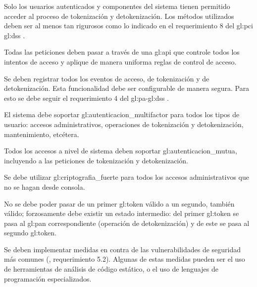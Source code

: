 {
  Solo los usuarios autenticados y componentes del sistema tienen permitido
  acceder al proceso de tokenización y detokenización. Los métodos utilizados
  deben ser al menos tan rigurosos como lo indicado en el requerimiento 8 del
  \gls{gl:pci} \gls{gl:dss} \cite{pci_dss}.

  {
    Todas las peticiones deben pasar a través de una \gls{gl:api} que controle
    todos los intentos de acceso y aplique de manera uniforma reglas de
    control de acceso.
  }

  {
    Se deben registrar todos los eventos de acceso, de tokenización y
    de detokenización. Esta funcionalidad debe ser configurable de manera
    segura. Para esto se debe seguir el requerimiento 4 del
    \gls{gl:pa}-\gls{gl:dss} \cite{dss_pa}.
  }

  {
    El sistema debe soportar \gls{gl:autenticacion_multifactor} para todos
    los tipos de usuario: accesos administrativos, operaciones de tokenización
    y detokenización, mantenimiento, etcétera.
  }

  {
    Todos los accesos a nivel de sistema deben soportar
    \gls{gl:autenticacion_mutua}, incluyendo a las peticiones de tokenización
    y detokenización.
  }

  {
    Se debe utilizar \gls{gl:criptografia_fuerte} para todos los accesos
    administrativos que no se hagan desde consola.
  }
}

{
  No se debe poder pasar de un primer \gls{gl:token} válido a un segundo,
  también válido; forzosamente debe existir un estado intermedio: del primer
  \gls{gl:token} se pasa al \gls{gl:pan} correspondiente (operación de
  detokenización) y de este se pasa al segundo \gls{gl:token}.
}

{
  Se deben implementar medidas en contra de las vulnerabilidades de
  seguridad más comunes (\cite{dss_pa}, requerimiento 5.2). Algunas de estas
  medidas pueden ser el uso de herramientas de análisis de código estático,
  o el uso de lenguajes de programación especializados.
}

